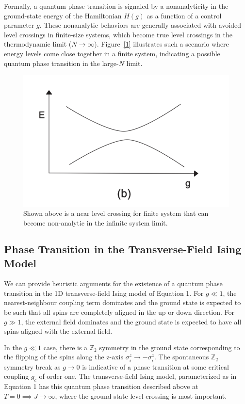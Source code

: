 \documentclass[pre,twocolumn,floatfix]{revtex4-1}
\begin{document}
Formally, a quantum phase transition is signaled by a nonanalyticity in the ground-state energy of the Hamiltonian $H(g)$ as a function of a control parameter $g$. These nonanalytic behaviors are generally associated with avoided level crossings in finite-size systems, which become true level crossings in the thermodynamic limit ($N \to \infty$). Figure~\ref{1} illustrates such a scenario where energy levels come close together in a finite system, indicating a possible quantum phase transition in the large-$N$ limit.

\begin{figure}
    \centering
    \includegraphics[width=0.5\linewidth]{images/截屏2025-05-22 21.25.44.png}
    \caption{Shown above is a near level crossing for finite system that can become non-analytic in the infinite system limit. }
    \label{fig:level-crossing}
\end{figure}

 \subsection{Phase Transition in the Transverse-Field Ising Model}
We can provide heuristic arguments for the existence of a quantum phase transition in the 1D transverse-field Ising
model of Equation 1. For $g\ll1$, the nearest-neighbour coupling term dominates and the ground state is expected
to be such that all spins are completely aligned in the up or down direction. For $g\gg1$, the external field dominates
and the ground state is expected to have all spins aligned with the external field.

In the $g\ll1$ case, there is a $\mathbb{Z}_2$ symmetry in the ground state corresponding to the flipping of the spins along the z-axis $\sigma_i^z\to-\sigma_i^z$. The spontaneous $\mathbb{Z}_2$ symmetry break as $g\to0$ is indicative of a phase transition at some critical
coupling $g_c$ of order one. The transverse-field Ising model, parameterized as in Equation 1 has this quantum phase
transition described above at $T=0\implies J\to\infty$, where the ground state level crossing is most important.
\end{document}
